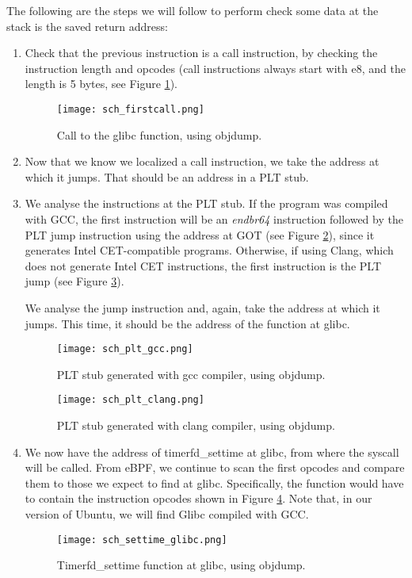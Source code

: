 The following are the steps we will follow to perform check some data at the stack is the saved return address:
\begin{enumerate}
\item Check that the previous instruction is a call instruction, by checking the instruction length and opcodes (call instructions always start with e8, and the length is 5 bytes, see Figure \ref{fig:firstcall}).
\begin{figure}[htbp]
	\centering
	\texttt{[image: sch\_firstcall.png]}
	\caption{Call to the glibc function, using objdump.}
	\label{fig:firstcall}
\end{figure}
\item Now that we know we localized a call instruction, we take the address at which it jumps. That should be an address in a PLT stub.
\item We analyse the instructions at the PLT stub. If the program was compiled with GCC, the first instruction will be an \textit{endbr64} instruction followed by the PLT jump instruction using the address at GOT (see Figure \ref{fig:plt_gcc}), since it generates Intel CET-compatible programs. Otherwise, if using Clang, which does not generate Intel CET instructions, the first instruction is the PLT jump (see Figure \ref{fig:plt_clang}).

We analyse the jump instruction and, again, take the address at which it jumps. This time, it should be the address of the function at glibc.
\begin{figure}[htbp]
	\centering
	\texttt{[image: sch\_plt\_gcc.png]}
	\caption{PLT stub generated with gcc compiler, using objdump.}
	\label{fig:plt_gcc}
\end{figure}
\begin{figure}[htbp]
	\centering
	\texttt{[image: sch\_plt\_clang.png]}
	\caption{PLT stub generated with clang compiler, using objdump.}
	\label{fig:plt_clang}
\end{figure}

\item We now have the address of timerfd\_settime at glibc, from where the syscall will be called. From eBPF, we continue to scan the first opcodes and compare them to those we expect to find at glibc. Specifically, the function would have to contain the instruction opcodes shown in Figure \ref{fig:settime_glibc}. Note that, in our version of Ubuntu, we will find Glibc compiled with GCC.

\begin{figure}[htbp]
	\centering
	\texttt{[image: sch\_settime\_glibc.png]}
	\caption{Timerfd\_settime function at glibc, using objdump.}
	\label{fig:settime_glibc}
\end{figure}

\end{enumerate}

